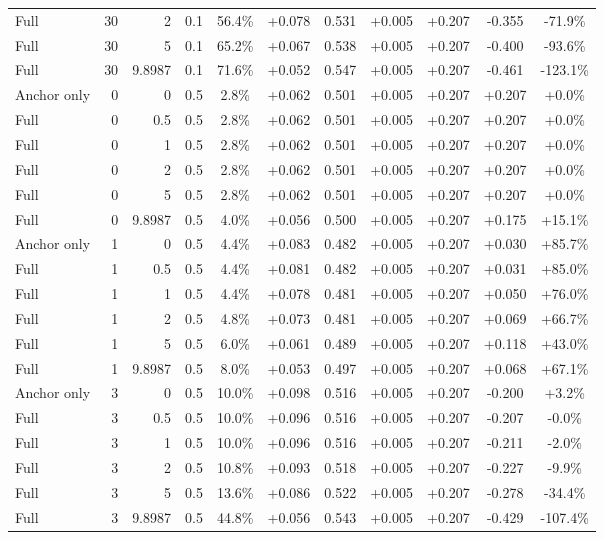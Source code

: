 \begin{table}[htbp]
\begin{tabular}{lrrrccccccc}
Full & 30 & 2 & 0.1 & 56.4\% & +0.078 & 0.531 & +0.005 & +0.207 & -0.355 & -71.9\% \\
Full & 30 & 5 & 0.1 & 65.2\% & +0.067 & 0.538 & +0.005 & +0.207 & -0.400 & -93.6\% \\
Full & 30 & 9.8987 & 0.1 & 71.6\% & +0.052 & 0.547 & +0.005 & +0.207 & -0.461 & -123.1\% \\
Anchor only & 0 & 0 & 0.5 & 2.8\% & +0.062 & 0.501 & +0.005 & +0.207 & +0.207 & +0.0\% \\
Full & 0 & 0.5 & 0.5 & 2.8\% & +0.062 & 0.501 & +0.005 & +0.207 & +0.207 & +0.0\% \\
Full & 0 & 1 & 0.5 & 2.8\% & +0.062 & 0.501 & +0.005 & +0.207 & +0.207 & +0.0\% \\
Full & 0 & 2 & 0.5 & 2.8\% & +0.062 & 0.501 & +0.005 & +0.207 & +0.207 & +0.0\% \\
Full & 0 & 5 & 0.5 & 2.8\% & +0.062 & 0.501 & +0.005 & +0.207 & +0.207 & +0.0\% \\
Full & 0 & 9.8987 & 0.5 & 4.0\% & +0.056 & 0.500 & +0.005 & +0.207 & +0.175 & +15.1\% \\
Anchor only & 1 & 0 & 0.5 & 4.4\% & +0.083 & 0.482 & +0.005 & +0.207 & +0.030 & +85.7\% \\
Full & 1 & 0.5 & 0.5 & 4.4\% & +0.081 & 0.482 & +0.005 & +0.207 & +0.031 & +85.0\% \\
Full & 1 & 1 & 0.5 & 4.4\% & +0.078 & 0.481 & +0.005 & +0.207 & +0.050 & +76.0\% \\
Full & 1 & 2 & 0.5 & 4.8\% & +0.073 & 0.481 & +0.005 & +0.207 & +0.069 & +66.7\% \\
Full & 1 & 5 & 0.5 & 6.0\% & +0.061 & 0.489 & +0.005 & +0.207 & +0.118 & +43.0\% \\
Full & 1 & 9.8987 & 0.5 & 8.0\% & +0.053 & 0.497 & +0.005 & +0.207 & +0.068 & +67.1\% \\
Anchor only & 3 & 0 & 0.5 & 10.0\% & +0.098 & 0.516 & +0.005 & +0.207 & -0.200 & +3.2\% \\
Full & 3 & 0.5 & 0.5 & 10.0\% & +0.096 & 0.516 & +0.005 & +0.207 & -0.207 & -0.0\% \\
Full & 3 & 1 & 0.5 & 10.0\% & +0.096 & 0.516 & +0.005 & +0.207 & -0.211 & -2.0\% \\
Full & 3 & 2 & 0.5 & 10.8\% & +0.093 & 0.518 & +0.005 & +0.207 & -0.227 & -9.9\% \\
Full & 3 & 5 & 0.5 & 13.6\% & +0.086 & 0.522 & +0.005 & +0.207 & -0.278 & -34.4\% \\
Full & 3 & 9.8987 & 0.5 & 44.8\% & +0.056 & 0.543 & +0.005 & +0.207 & -0.429 & -107.4\% \\

\end{tabular}
\end{table}
